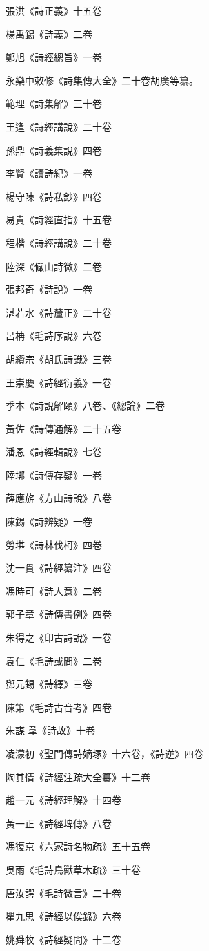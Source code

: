 張洪《詩正義》十五卷

楊禹錫《詩義》二卷

鄭旭《詩經總旨》一卷

永樂中敕修《詩集傳大全》二十卷胡廣等纂。

範理《詩集解》三十卷

王逢《詩經講說》二十卷

孫鼎《詩義集說》四卷

李賢《讀詩紀》一卷

楊守陳《詩私鈔》四卷

易貴《詩經直指》十五卷

程楷《詩經講說》二十卷

陸深《儼山詩微》二卷

張邦奇《詩說》一卷

湛若水《詩釐正》二十卷

呂柟《毛詩序說》六卷

胡纘宗《胡氏詩識》三卷

王崇慶《詩經衍義》一卷

季本《詩說解頤》八卷、《總論》二卷

黃佐《詩傳通解》二十五卷

潘恩《詩經輯說》七卷

陸垹《詩傳存疑》一卷

薛應旂《方山詩說》八卷

陳錫《詩辨疑》一卷

勞堪《詩林伐柯》四卷

沈一貫《詩經纂注》四卷

馮時可《詩人意》二卷

郭子章《詩傳書例》四卷

朱得之《印古詩說》一卷

袁仁《毛詩或問》二卷

鄧元錫《詩繹》三卷

陳第《毛詩古音考》四卷

朱謀韋《詩故》十卷

凌濛初《聖門傳詩嫡塚》十六卷，《詩逆》四卷

陶其情《詩經注疏大全纂》十二卷

趙一元《詩經理解》十四卷

黃一正《詩經埤傳》八卷

馮復京《六家詩名物疏》五十五卷

吳雨《毛詩鳥獸草木疏》三十卷

唐汝諤《毛詩微言》二十卷

瞿九思《詩經以俟錄》六卷

姚舜牧《詩經疑問》十二卷


